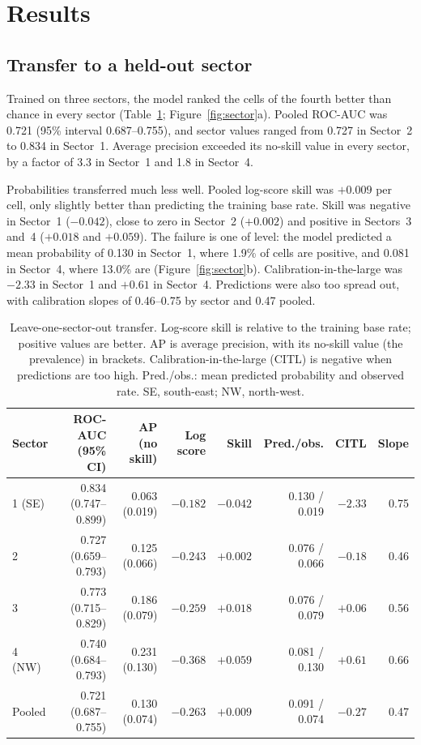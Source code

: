 \documentclass[pdflatex,sn-basic]{sn-jnl}%
\begin{document}
\section{Results}

\subsection{Transfer to a held-out sector}
\label{sec:res-loso}

Trained on three sectors, the model ranked the cells of the fourth better than chance in every sector (Table~\ref{tab:loso}; Figure~\ref{fig:sector}a). Pooled ROC-AUC was 0.721 (95\% interval 0.687--0.755), and sector values ranged from 0.727 in Sector~2 to 0.834 in Sector~1. Average precision exceeded its no-skill value in every sector, by a factor of 3.3 in Sector~1 and 1.8 in Sector~4.

Probabilities transferred much less well. Pooled log-score skill was $+0.009$ per cell, only slightly better than predicting the training base rate. Skill was negative in Sector~1 ($-0.042$), close to zero in Sector~2 ($+0.002$) and positive in Sectors~3 and~4 ($+0.018$ and $+0.059$). The failure is one of level: the model predicted a mean probability of 0.130 in Sector~1, where 1.9\% of cells are positive, and 0.081 in Sector~4, where 13.0\% are (Figure~\ref{fig:sector}b). Calibration-in-the-large was $-2.33$ in Sector~1 and $+0.61$ in Sector~4. Predictions were also too spread out, with calibration slopes of 0.46--0.75 by sector and 0.47 pooled.

\begin{table}[tbp]
\centering
\small
\caption{Leave-one-sector-out transfer. Log-score skill is relative to the training base rate; positive values are better. AP is average precision, with its no-skill value (the prevalence) in brackets. Calibration-in-the-large (CITL) is negative when predictions are too high. Pred./obs.: mean predicted probability and observed rate. SE, south-east; NW, north-west.}
\label{tab:loso}
\footnotesize\setlength{\tabcolsep}{3pt}
\begin{tabular}{lrrrrrrr}
\toprule
Sector & ROC-AUC (95\% CI) & AP (no skill) & Log score & Skill & Pred./obs. & CITL & Slope \\
\midrule
1 (SE) & 0.834 (0.747--0.899) & 0.063 (0.019) & $-0.182$ & $-0.042$ & 0.130 / 0.019 & $-2.33$ & 0.75 \\
2 & 0.727 (0.659--0.793) & 0.125 (0.066) & $-0.243$ & $+0.002$ & 0.076 / 0.066 & $-0.18$ & 0.46 \\
3 & 0.773 (0.715--0.829) & 0.186 (0.079) & $-0.259$ & $+0.018$ & 0.076 / 0.079 & $+0.06$ & 0.56 \\
4 (NW) & 0.740 (0.684--0.793) & 0.231 (0.130) & $-0.368$ & $+0.059$ & 0.081 / 0.130 & $+0.61$ & 0.66 \\
\midrule
Pooled & 0.721 (0.687--0.755) & 0.130 (0.074) & $-0.263$ & $+0.009$ & 0.091 / 0.074 & $-0.27$ & 0.47 \\
\bottomrule
\end{tabular}
\end{table}
\end{document}
